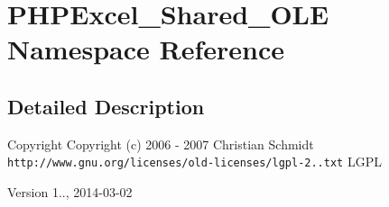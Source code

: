 \section{P\+H\+P\+Excel\+\_\+\+Shared\+\_\+\+O\+L\+E Namespace Reference}
\label{namespace_p_h_p_excel___shared___o_l_e}


\subsection{Detailed Description}
\begin{DoxyCopyright}{Copyright}
Copyright (c) 2006 -\/ 2007 Christian Schmidt  {\tt http\+://www.\+gnu.\+org/licenses/old-\/licenses/lgpl-\/2..\+txt} L\+G\+P\+L 
\end{DoxyCopyright}
\begin{DoxyVersion}{Version}
1.., 2014-\/03-\/02 
\end{DoxyVersion}
